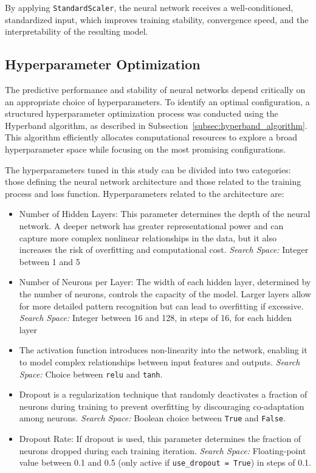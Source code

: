 {By applying \texttt{StandardScaler}, the neural network receives a well-conditioned, standardized input, which improves training stability, convergence speed, and the interpretability of the resulting model.

\subsection{Hyperparameter Optimization}
\label{subsec:hyperparameter_optimization}

The predictive performance and stability of neural networks depend critically on an appropriate choice of hyperparameters. To identify an optimal configuration, a structured hyperparameter optimization process was conducted using the Hyperband algorithm, as described in Subsection~\ref{subsec:hyperband_algorithm}. This algorithm efficiently allocates computational resources to explore a broad hyperparameter space while focusing on the most promising configurations.

The hyperparameters tuned in this study can be divided into two categories: those defining the neural network architecture and those related to the training process and loss function. Hyperparameters related to the architecture are:
\begin{itemize}
	\item Number of Hidden Layers: This parameter determines the depth of the neural network. A deeper network has greater representational power and can capture more complex nonlinear relationships in the data, but it also increases the risk of overfitting and computational cost. \newline
	      \textit{Search Space:} Integer between 1 and 5
	\item Number of Neurons per Layer: The width of each hidden layer, determined by the number of neurons, controls the capacity of the model. Larger layers allow for more detailed pattern recognition but can lead to overfitting if excessive. \newline
	      \textit{Search Space:} Integer between 16 and 128, in steps of 16, for each hidden layer
	\item The activation function introduces non-linearity into the network, enabling it to model complex relationships between input features and outputs. \newline
	      \textit{Search Space:} Choice between \texttt{relu} and \texttt{tanh}.
	\item Dropout is a regularization technique that randomly deactivates a fraction of neurons during training to prevent overfitting by discouraging co-adaptation among neurons. \newline
	      \textit{Search Space:} Boolean choice between \texttt{True} and \texttt{False}.
	\item Dropout Rate: If dropout is used, this parameter determines the fraction of neurons dropped during each training iteration. \newline
	      \textit{Search Space:} Floating-point value between 0.1 and 0.5 (only active if \texttt{use\_dropout = True}) in steps of 0.1.


\end{itemize}}
